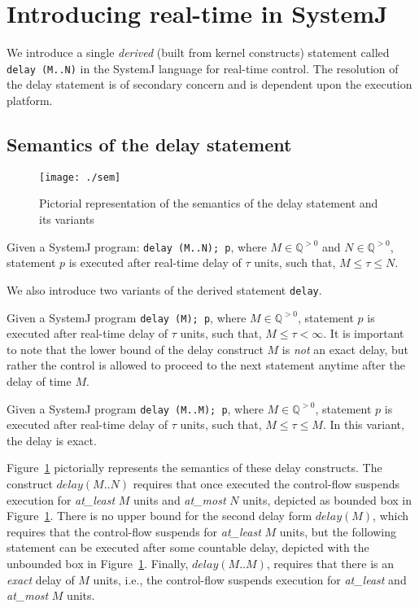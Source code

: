 \section{Introducing real-time in SystemJ}
\label{sec:intr-real-time}

We introduce a single \textit{derived} (built from kernel constructs)
statement called \mbox{\texttt{delay (M..N)}} in the SystemJ language
for real-time control. The resolution of the delay statement is of
secondary concern and is dependent upon the execution platform. 


\subsection{Semantics of the delay statement}
\label{sec:semant-delay-stat}

\begin{figure}[t!]
  \centering
  \texttt{[image: ./sem]}
  \caption{Pictorial representation of the semantics of the delay
    statement and its variants}
  \label{fig:5}
\end{figure}

Given a SystemJ program: \texttt{delay (M..N); p}, where $M \in
\mathbb{Q}^{>0}$ and $N \in \mathbb{Q}^{>0}$, statement $p$ is executed
after real-time delay of $\tau$ units, such that, $M \leq \tau \leq N$.

We also introduce two variants of the derived statement \texttt{delay}.
\begin{enumerate*}
\item Given a SystemJ program \texttt{delay (M); p}, where $M \in
  \mathbb{Q}^{>0}$, statement $p$ is executed after real-time delay of
  $\tau$ units, such that, $M \leq \tau < \infty$. It is important to
  note that the lower bound of the delay construct $M$ is \textit{not}
  an exact delay, but rather the control is allowed to proceed to the
  next statement anytime after the delay of time $M$.
\item Given a SystemJ program \texttt{delay (M..M); p}, where $M \in
  \mathbb{Q}^{>0}$, statement $p$ is executed after real-time delay of
  $\tau$ units, such that, $M \leq \tau \leq M$. In this variant, the
  delay is exact.
\end{enumerate*}

Figure~\ref{fig:5} pictorially represents the semantics of these delay
constructs. The construct $delay (M..N)$ requires that once executed the
control-flow suspends execution for \textit{at\_least} $M$ units and
\textit{at\_most} $N$ units, depicted as bounded box in
Figure~\ref{fig:5}. There is no upper bound for the second delay form
$delay(M)$, which requires that the control-flow suspends for
\textit{at\_least} $M$ units, but the following statement can be
executed after some countable delay, depicted with the unbounded box in
Figure~\ref{fig:5}. Finally, $delay(M..M)$, requires that there is an
\textit{exact} delay of $M$ units, i.e., the control-flow suspends
execution for \textit{at\_least} and \textit{at\_most} $M$ units.

